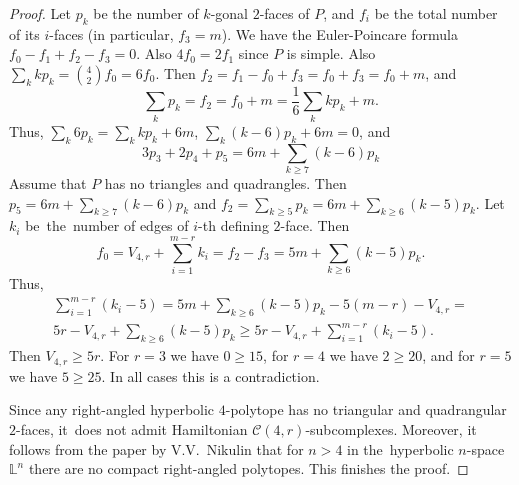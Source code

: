 \documentclass[12pt]{amsart}
\theoremstyle{definition}
\theoremstyle{remark}
\begin{document}
\begin{proof}
Let $p_k$ be the number of $k$-gonal $2$-faces of $P$, and $f_i$ be the total number of its $i$-faces 
(in particular, $f_3=m$). We have the Euler-Poincare formula $f_0-f_1+f_2-f_3=0$. Also $4f_0=2f_1$ since $P$ is simple.
Also $\sum\limits_k kp_k={4\choose 2} f_0=6f_0$.
Then $f_2=f_1-f_0+f_3=f_0+f_3=f_0+m$, and 
$$
\sum\limits_kp_k=f_2=f_0+m=\frac{1}{6}\sum\limits_k kp_k+m.
$$
Thus, $\sum\limits_k6p_k=\sum\limits_k kp_k+6m$, $\sum\limits_k(k-6)p_k+6m=0$, and 
\begin{equation}
3p_3+2p_4+p_5=6m+\sum\limits_{k\geqslant 7}(k-6)p_k
\end{equation}
Assume that  $P$ has no triangles and quadrangles. Then $p_5=6m+\sum_{k\geqslant 7}(k-6)p_k$
and $f_2=\sum\limits_{k\geqslant 5} p_k=6m+\sum_{k\geqslant 6}(k-5)p_k$.
Let $k_i$ be~the~number of edges of $i$-th defining $2$-face. Then 
$$
f_0=V_{4,r}+\sum_{i=1}^{m-r} k_i=f_2-f_3=5m+\sum_{k\geqslant 6}(k-5)p_k.
$$
Thus, 
\begin{gather*}
\sum_{i=1}^{m-r} (k_i-5)=5m+\sum_{k\geqslant 6}(k-5)p_k-5(m-r)-V_{4,r}=\\
5r-V_{4,r}+\sum_{k\geqslant 6}(k-5)p_k\geqslant
5r-V_{4,r}+\sum_{i=1}^{m-r} (k_i-5).
\end{gather*}
Then $V_{4,r}\geqslant 5r$. For $r=3$ we have $0\geqslant 15$, for $r=4$ we have $2\geqslant 20$, and for $r=5$ we have $5\geqslant 25$. In all cases this is a contradiction.

Since any right-angled hyperbolic $4$-polytope has no triangular and quadrangular $2$-faces,
it~does not admit Hamiltonian $\mathcal{C}(4,r)$-subcomplexes. Moreover, it follows from
the paper \cite{N82} by V.V.~Nikulin that for $n>4$ in the~hyperbolic $n$-space $\mathbb L^n$
there are no compact right-angled polytopes. This finishes the proof.
\end{proof}
\end{document}
